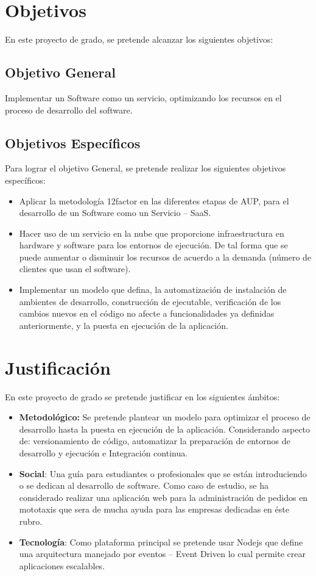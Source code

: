 \section{Objetivos}
\noindent En este proyecto de grado, se pretende alcanzar los siguientes objetivos:

\subsection{Objetivo General}

\noindent Implementar un Software como un servicio, optimizando los recursos en el proceso de desarrollo del software. 


\subsection{Objetivos Específicos}

\noindent Para lograr el objetivo General, se pretende realizar los siguientes objetivos específicos:
\begin{itemize}
  \item Aplicar la metodología 12factor en las diferentes etapas de AUP, para el desarrollo de un Software como un Servicio – SaaS.
  \item Hacer uso de un servicio en la nube que proporcione  infraestructura en hardware y software para los entornos de ejecución. De tal forma que se puede aumentar o disminuir los recursos de acuerdo a la demanda (número de clientes que usan el software).
  \item Implementar un modelo que defina, la automatización de instalación de ambientes de desarrollo, construcción de ejecutable, verificación de los cambios nuevos en el código no afecte a funcionalidades ya definidas anteriormente, y la puesta en ejecución de la aplicación.
\end{itemize}

\section{Justificación}
\noindent En este proyecto de grado se pretende justificar en los siguientes ámbitos:
\begin{itemize}
  \item \textbf{Metodológico:} Se pretende plantear un modelo para optimizar el proceso de desarrollo hasta la puesta en ejecución de la aplicación. Considerando aspecto de: versionamiento de código, automatizar la preparación de entornos de desarrollo y ejecución e Integración continua.
  \item \textbf{Social}: Una guía para estudiantes o profesionales que se están introduciendo o se dedican al desarrollo de software. Como caso de estudio, se ha considerado realizar una aplicación web para la administración de pedidos en mototaxis que sera de mucha ayuda para las empresas dedicadas en éste rubro.
  \item \textbf{Tecnología}: Como plataforma principal se pretende usar Nodejs que define una arquitectura manejado por eventos – Event Driven lo cual permite crear aplicaciones escalables.
\end{itemize}

